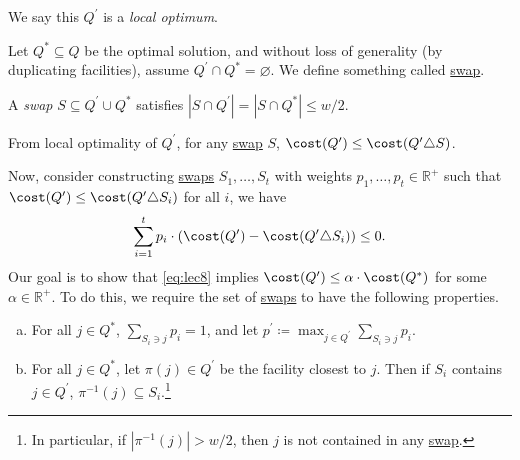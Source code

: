\begin{note}
	We say this \(Q^\prime \) is a \emph{local optimum}.
\end{note}

Let \(Q^{\ast} \subseteq Q\) be the optimal solution, and without loss of generality (by duplicating facilities), assume \(Q^\prime \cap Q^{\ast} = \varnothing \). We define something called \hyperref[not:swap]{swap}.

\begin{notation}[Swap]\label{not:swap}
	A \emph{swap} \(S \subseteq Q^\prime \cup Q^{\ast} \) satisfies \(\left\vert S \cap Q^\prime  \right\vert = \left\vert S \cap Q^{\ast}  \right\vert \leq w / 2\).
\end{notation}

\begin{note}
	From local optimality of \(Q^\prime \), for any \hyperref[not:swap]{swap} \(S\), \(\cost(Q^\prime ) \leq \cost(Q^\prime \triangle S)\).
\end{note}

Now, consider constructing \hyperref[not:swap]{swaps} \(S_1, \dots, S_t\) with weights \(p_1, \dots , p_t \in \mathbb{R} ^+\) such that \(\cost(Q^\prime ) \leq \cost(Q^\prime \triangle S_i)\) for all \(i\), we have
\begin{equation}\label{eq:lec8}
	\sum_{i=1} ^t p_i \cdot (\cost(Q^\prime ) - \cost(Q^\prime \triangle S_i)) \leq 0.
\end{equation}
Our goal is to show that \autoref{eq:lec8} implies \(\cost(Q^\prime ) \leq \alpha\cdot \cost(Q^{\ast} )\) for some \(\alpha \in \mathbb{R} ^+\). To do this, we require the set of \hyperref[not:swap]{swaps} to have the following properties.

\begin{enumerate}[(a)]
	\item For all \(j\in Q^{\ast} \), \(\sum_{S_i \ni j}p_i = 1 \), and let \(p^\prime \coloneqq \max _{j\in Q^\prime }\sum_{S_i\ni j}p_i\).
	\item For all \(j\in Q^{\ast} \), let \(\pi (j)\in Q^\prime \) be the facility closest to \(j\). Then if \(S_i\) contains \(j\in Q^\prime \), \(\pi ^{-1} (j)\subseteq S_i\).\footnote{In particular, if \(\left\vert \pi ^{-1} (j) \right\vert > w / 2 \), then \(j\) is not contained in any \hyperref[not:swap]{swap}.}
\end{enumerate}


